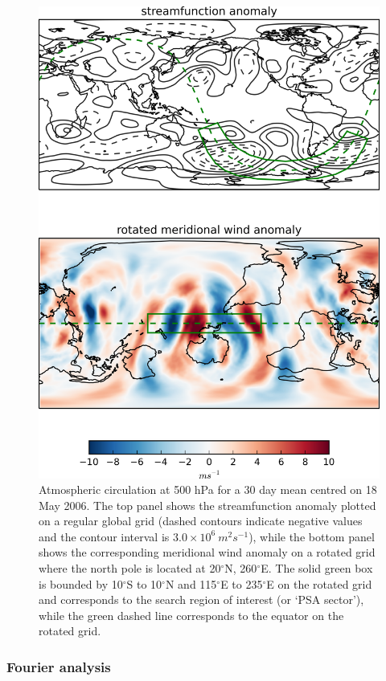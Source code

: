 \begin{figure}
\begin{center}
\includegraphics[width=0.7\columnwidth]{figures/psa/rotation_example_2006-05-18.png}
\caption[Coordinate system rotation and corresponding 500 hPa meridional wind conversion for a 30 day mean centred on 18 May 2006]{\label{fig:rotation}
Atmospheric circulation at 500 hPa for a 30 day mean centred on 18 May 2006. The top panel shows the streamfunction anomaly plotted on a regular global grid (dashed contours indicate negative values and the contour interval is $3.0 \times 10^6 \: m^2 s^{-1}$), while the bottom panel shows the corresponding meridional wind anomaly on a rotated grid where the north pole is located at 20$^{\circ}$N, 260$^{\circ}$E. The solid green box is bounded by 10$^{\circ}$S to 10$^{\circ}$N and 115$^{\circ}$E to 235$^{\circ}$E on the rotated grid and corresponds to the search region of interest (or `PSA sector'), while the green dashed line corresponds to the equator on the rotated grid.%
}
\end{center}
\end{figure}

\subsubsection{Fourier analysis}

